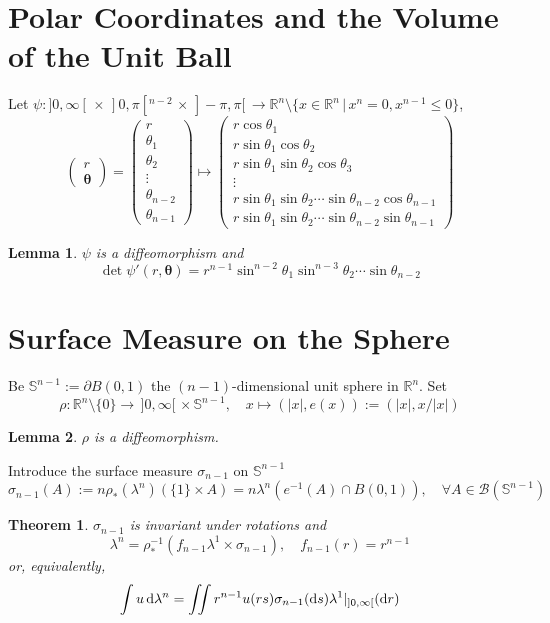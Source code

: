 \documentclass[11pt, a4paper, openany]{book}
\newtheorem{thm}{Theorem}\newtheorem{lem}{Lemma}\newtheorem{crl}{Corollary}
\theoremstyle{definition}
\begin{document}
\section{Polar Coordinates and the Volume of the Unit Ball}
    Let $\psi:]0,\infty[\,\times\, ]0,\pi[^{n-2}\,\times\, ]-\pi,\pi[\,\rightarrow \mathbb{R}^n\setminus\{x\in\mathbb{R}^n\,|\,x^n=0,x^{n-1}\leqslant 0\}$,
    \[
    \begin{pmatrix}
        r\\
        \bm{\theta}
    \end{pmatrix}=\begin{pmatrix}
        r\\
        \theta_1\\
        \theta_2\\
        \vdots\\
        \theta_{n-2}\\
        \theta_{n-1}
    \end{pmatrix}\mapsto\begin{pmatrix}
        r\cos\theta_1\\
        r\sin\theta_1\cos\theta_2\\
        r\sin\theta_1\sin\theta_2\cos\theta_3\\
        \vdots\\
        r\sin\theta_1\sin\theta_2\cdots\sin\theta_{n-2}\cos\theta_{n-1}\\
        r\sin\theta_1\sin\theta_2\cdots\sin\theta_{n-2}\sin\theta_{n-1}
    \end{pmatrix}\]
    \begin{lem}
        $\psi$ is a diffeomorphism and
        \[\det\psi'(r,\bm{\theta})=r^{n-1}\sin^{n-2}\theta_1\sin^{n-3}\theta_2\cdots\sin\theta_{n-2}\]
    \end{lem}
\section{Surface Measure on the Sphere}
    Be $\mathbb{S}^{n-1}:=\partial B(0,1)$ the $(n-1)$-dimensional unit sphere in $\mathbb{R}^n$. Set
    \[\rho:\mathbb{R}^n\setminus\{0\}\rightarrow \,]0,\infty[\,\times\mathbb{S}^{n-1},\quad x\mapsto (|x|,e(x)):=(|x|,x/|x|)\]
    \begin{lem}
        $\rho$ is a diffeomorphism.
    \end{lem}
    Introduce the surface measure $\sigma_{n-1}$ on $\mathbb{S}^{n-1}$
    \[\sigma_{n-1}(A):=n\rho_*(\lambda^n)(\{1\}\times A)=n\lambda^n(e^{-1}(A)\cap B(0,1)),\quad\forall A\in\mathscr{B}(\mathbb{S}^{n-1})\]
    \begin{thm}
        $\sigma_{n-1}$ is invariant under rotations and
        \[\lambda^n=\rho^{-1}_*(f_{n-1}\lambda^1\times \sigma_{n-1}),\quad f_{n-1}(r)=r^{n-1}\]
        or, equivalently,
        \[\int u\odif\lambda^n=\iint r^{n-1}u(rs)\sigma_{n-1}(\odif s)\lambda^1|_{]0,\infty[}(\odif r)\]
    \end{thm}
    
\end{document}
